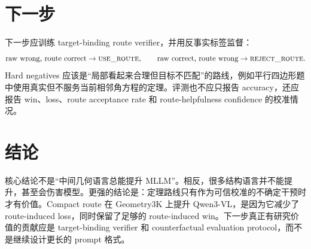 \documentclass[UTF8,11pt]{ctexart}
\begin{document}
\section{下一步}
下一步应训练 target-binding route verifier，并用反事实标签监督：
\[
\text{raw wrong, route correct}\rightarrow \textsc{use\_route},
\qquad
\text{raw correct, route wrong}\rightarrow \textsc{reject\_route}.
\]
Hard negatives 应该是“局部看起来合理但目标不匹配”的路线，例如平行四边形题中使用真实但不服务当前相邻角方程的定理。评测也不应只报告 accuracy，还应报告 win、loss、route acceptance rate 和 route-helpfulness confidence 的校准情况。

\section{结论}
核心结论不是“中间几何语言总能提升 MLLM”。相反，很多结构语言并不能提升，甚至会伤害模型。更强的结论是：定理路线只有作为可信校准的不确定干预时才有价值。Compact route 在 Geometry3K 上提升 Qwen3-VL，是因为它减少了 route-induced loss，同时保留了足够的 route-induced win。下一步真正有研究价值的贡献应是 target-binding verifier 和 counterfactual evaluation protocol，而不是继续设计更长的 prompt 格式。
\end{document}
